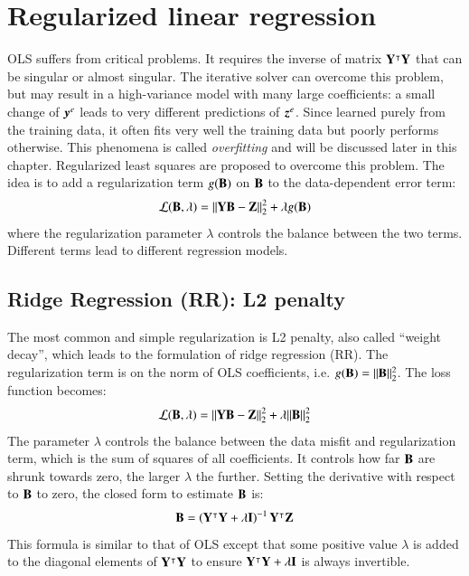 \section{Regularized linear regression}
\label{sec:regularized_linear_regression}
OLS suffers from critical problems. It requires the inverse of matrix $ \mathbf{Y}^{\intercal}\mathbf{Y} $ that can be singular or almost singular. The iterative solver can overcome this problem, but may result in a high-variance model with many large coefficients: a small change of $\operatorname{\boldsymbol{y}}^{e}$ leads to very different predictions of $\operatorname{\boldsymbol{z}}^{e}$. Since learned purely from the training data, it often fits very well the training data but poorly performs otherwise. This phenomena is called \textit{overfitting} and will be discussed later in this chapter. Regularized least squares are proposed to overcome this problem. The idea is to add a regularization term $ g(\mathbf{B}) $ on $ \mathbf{B} $ to the data-dependent error term:
\begin{equation}
	\mathcal{L}(\mathbf{B}, \lambda) = \Vert \mathbf{Y}\mathbf{B}-\mathbf{Z}\Vert^2_2 +\lambda g(\mathbf{B})
	\label{eq:regularized_linear_regression1}
\end{equation}
where the regularization parameter $ \lambda $ controls the balance between the two terms. Different terms lead to different regression models.

\subsection{Ridge Regression (RR): L2 penalty}
\label{sec:l2_penalty}
The most common and simple regularization is L2 penalty, also called ``weight decay'', which leads to the formulation of ridge regression (RR). The regularization term is on the norm of OLS coefficients, i.e. $ g(\mathbf{B}) = \Vert \mathbf{B} \Vert^2_2$. The loss function becomes:
\begin{equation}
\mathcal{L}(\mathbf{B}, \lambda) = \Vert \mathbf{Y}\mathbf{B}-\mathbf{Z}\Vert^2_2 +\lambda\Vert \mathbf{B} \Vert^2_2 
\label{eq:RR1}
\end{equation}
The parameter $\lambda $ controls the balance between the data misfit and regularization term, which is the sum of squares of all coefficients. It controls how far $ \mathbf{B} $ are shrunk towards zero, the larger $ \lambda $ the further. Setting the derivative with respect to $ \mathbf{B} $ to zero, the closed form to estimate $ \mathbf{B} $ is:
\begin{equation}
\mathbf{B}=\left( \mathbf{Y} ^{\intercal}\mathbf{Y}+\lambda \mathbf{I} \right)^{-1}  \mathbf{Y} ^{\intercal}\mathbf{Z} 
\label{eq:RR2}
\end{equation}
This formula is similar to that of OLS except that some positive value $ \lambda $ is added to the diagonal elements of $ \mathbf{Y}^{\intercal}\mathbf{Y} $ to ensure $ \mathbf{Y}^{\intercal}\mathbf{Y} +\lambda \mathbf{I}$ is always invertible.

